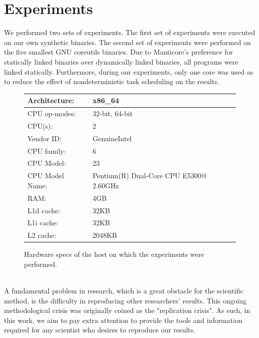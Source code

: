 \documentclass{kththesis}
\newcommand{\fbcomment}[1]{{#1}}
\renewcommand{\fbcomment}[1]{}
\begin{document}
\section{Experiments}
\fbcomment{\color{red}Goal: Describe what experiments were done and why. Also, describe with enough details for the experiments to be reproducible}
We performed two sets of experiments. The first set of experiments were executed on our own synthetic binaries. The second set of experiments were performed on the five smallest GNU coreutils binaries. Due to Manticore's preference for statically linked binaries over dynamically linked binaries, all programs were linked statically. Furthermore, during our experiments, only one core was used as to reduce the effect of nondeterministic task scheduling on the results. 
\begin{figure}[ht]
\begin{tabular}{|ll|}
\hline
Architecture:   & x86\_64                                 \\ \hline
CPU op-modes: & 32-bit, 64-bit                            \\ \hline
CPU(s):         & 2                                       \\ \hline
Vendor ID:      & GenuineIntel                            \\ \hline
CPU family:     & 6                                       \\ \hline
CPU Model:      & 23                                      \\ \hline
CPU Model Name: & Pentium(R) Dual-Core CPU E5300@ 2.60GHz \\ \hline
RAM:            & 4GB                                     \\ \hline%
L1d cache:      & 32KB                                    \\ \hline
L1i cache:      & 32KB                                    \\ \hline
L2 cache:       & 2048KB                                  \\ \hline
\end{tabular}
\caption{Hardware specs of the host on which the experiments were performed.}
\label{fig:HWspecs}
\end{figure}
\noindent
\\ 
A fundamental problem in research, which is a great obstacle for the scientific method, is the difficulty in reproducing other researchers' results. This ongoing methodological crisis was originally coined as the "replication crisis"\cite{replicability}. As such, in this work, we aim to pay extra attention to provide the tools and information required for any scientist who desires to reproduce our results. 
\end{document}
